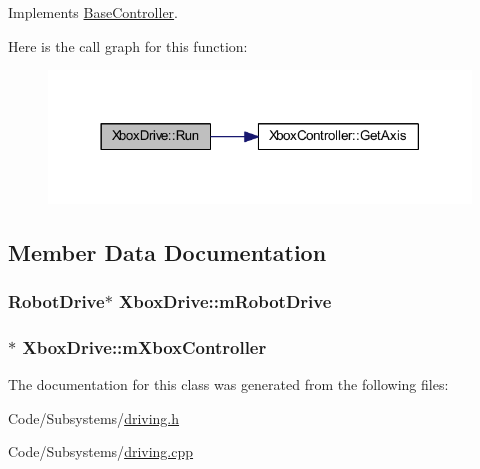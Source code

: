 \-Implements \hyperlink{class_base_controller_a2c73f08fa403e1a4912ce4aaa348ac61}{\-Base\-Controller}.



\-Here is the call graph for this function\-:\nopagebreak
\begin{figure}[H]
\begin{center}
\leavevmode
\includegraphics[width=318pt]{class_xbox_drive_a076db41b38356179e1263a52b110febb_cgraph}
\end{center}
\end{figure}




\subsection{\-Member \-Data \-Documentation}
\hypertarget{class_xbox_drive_a446918910e20d42cda7897f1ccef2d33}{
\subsubsection[{m\-Robot\-Drive}]{\setlength{\rightskip}{0pt plus 5cm}\-Robot\-Drive$\ast$ {\bf \-Xbox\-Drive\-::m\-Robot\-Drive}}}\label{class_xbox_drive_a446918910e20d42cda7897f1ccef2d33}
\hypertarget{class_xbox_drive_a8c168152c85e82dcc8116a7eb9ea84e9}{
\subsubsection[{m\-Xbox\-Controller}]{$\ast$ {\bf \-Xbox\-Drive\-::m\-Xbox\-Controller}}}\label{class_xbox_drive_a8c168152c85e82dcc8116a7eb9ea84e9}


\-The documentation for this class was generated from the following files\-:\begin{DoxyCompactItemize}
\item 
\-Code/\-Subsystems/\hyperlink{driving_8h}{driving.\-h}\item 
\-Code/\-Subsystems/\hyperlink{driving_8cpp}{driving.\-cpp}\end{DoxyCompactItemize}
